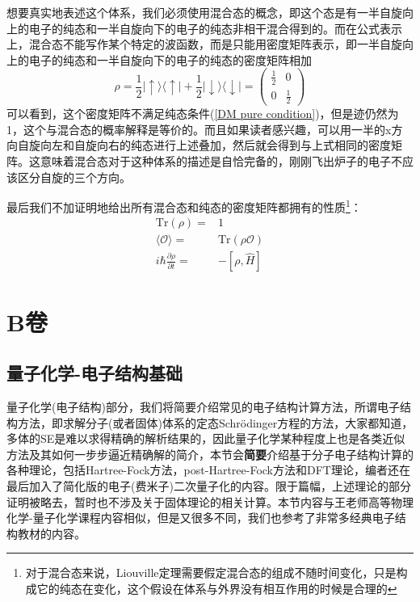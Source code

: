 \documentclass[12pt,a4paper,openany,twoside]{book}
\numberwithin{equation}{section}
\newcommand{\sch}{Schr\"odinger}
\begin{document}
        想要真实地表述这个体系，我们必须使用混合态的概念，即这个态是有一半自旋向上的电子的纯态和一半自旋向下的电子的纯态非相干混合得到的。而在公式表示上，混合态不能写作某个特定的波函数，而是只能用密度矩阵表示，即一半自旋向上的电子的纯态和一半自旋向下的电子的纯态的密度矩阵相加
        \begin{equation}
          \rho = \frac{1}{2} | \uparrow \rangle \langle \uparrow |+\frac{1}{2} | \downarrow \rangle \langle \downarrow |=\left(\begin{array}{ll}
            {\frac{1}{2}} & {0} \\
            {0} & {\frac{1}{2}}
          \end{array}\right)
        \end{equation}
        可以看到，这个密度矩阵不满足纯态条件(\ref{DM pure condition})，但是迹仍然为1，这个与混合态的概率解释是等价的。而且如果读者感兴趣，可以用一半的x方向自旋向左和自旋向右的纯态进行上述叠加，然后就会得到与上式相同的密度矩阵。这意味着混合态对于这种体系的描述是自恰完备的，刚刚飞出炉子的电子不应该区分自旋的三个方向。
        
        最后我们不加证明地给出所有混合态和纯态的密度矩阵都拥有的性质\footnote{对于混合态来说，Liouville定理需要假定混合态的组成不随时间变化，只是构成它的纯态在变化，这个假设在体系与外界没有相互作用的时候是合理的}：\\
        \begin{align*}
          \text{Tr}(\rho)=&1\\
          \langle\mathcal{O}\rangle=&\text{Tr}(\rho \mathcal{O})\\
          i \hbar \frac{\partial \rho}{\partial t}=&-[\rho,\hat{H}]
        \end{align*}
    
    \part{B卷}
    \chapter{量子化学-电子结构基础}
      量子化学(电子结构)部分，我们将简要介绍常见的电子结构计算方法，所谓电子结构方法，即求解分子(或者固体)体系的定态\sch 方程的方法，大家都知道，多体的SE是难以求得精确的解析结果的，因此量子化学某种程度上也是各类近似方法及其如何一步步逼近精确解的简介，本节会\textbf{简要}介绍基于分子电子结构计算的各种理论，包括Hartree-Fock方法，post-Hartree-Fock方法和DFT理论，编者还在最后加入了简化版的电子(费米子)二次量子化的内容。限于篇幅，上述理论的部分证明被略去，暂时也不涉及关于固体理论的相关计算。本节内容与王老师高等物理化学-量子化学课程内容相似，但是又很多不同，我们也参考了非常多经典电子结构教材的内容。
      
\end{document}
